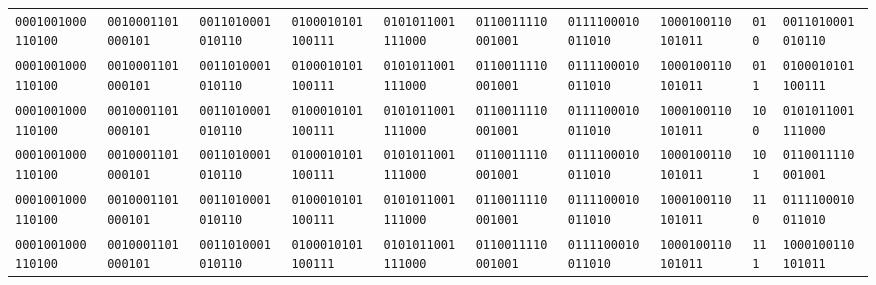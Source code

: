\documentclass[12pt]{article}
\begin{document}
\begin{table}[H]
{\begin{tabular}{@{}llllllllll@{}}
        \texttt{0001001000110100} &
          \texttt{0010001101000101} &
          \texttt{0011010001010110} &
          \texttt{0100010101100111} &
          \texttt{0101011001111000} &
          \texttt{0110011110001001} &
          \texttt{0111100010011010} &
          \texttt{1000100110101011} &
          \texttt{010} &
          \texttt{0011010001010110} \\
        \texttt{0001001000110100} &
          \texttt{0010001101000101} &
          \texttt{0011010001010110} &
          \texttt{0100010101100111} &
          \texttt{0101011001111000} &
          \texttt{0110011110001001} &
          \texttt{0111100010011010} &
          \texttt{1000100110101011} &
          \texttt{011} &
          \texttt{0100010101100111} \\
        \texttt{0001001000110100} &
          \texttt{0010001101000101} &
          \texttt{0011010001010110} &
          \texttt{0100010101100111} &
          \texttt{0101011001111000} &
          \texttt{0110011110001001} &
          \texttt{0111100010011010} &
          \texttt{1000100110101011} &
          \texttt{100} &
          \texttt{0101011001111000} \\
        \texttt{0001001000110100} &
          \texttt{0010001101000101} &
          \texttt{0011010001010110} &
          \texttt{0100010101100111} &
          \texttt{0101011001111000} &
          \texttt{0110011110001001} &
          \texttt{0111100010011010} &
          \texttt{1000100110101011} &
          \texttt{101} &
          \texttt{0110011110001001} \\
        \texttt{0001001000110100} &
          \texttt{0010001101000101} &
          \texttt{0011010001010110} &
          \texttt{0100010101100111} &
          \texttt{0101011001111000} &
          \texttt{0110011110001001} &
          \texttt{0111100010011010} &
          \texttt{1000100110101011} &
          \texttt{110} &
          \texttt{0111100010011010} \\
        \texttt{0001001000110100} &
          \texttt{0010001101000101} &
          \texttt{0011010001010110} &
          \texttt{0100010101100111} &
          \texttt{0101011001111000} &
          \texttt{0110011110001001} &
          \texttt{0111100010011010} &
          \texttt{1000100110101011} &
          \texttt{111} &
          \texttt{1000100110101011} \\ \bottomrule
        \end{tabular}%
        }
        \end{table}
\end{document}
